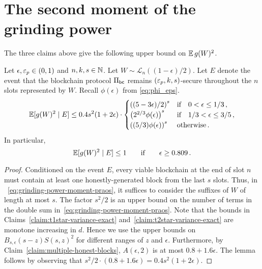 \section{The second moment of the grinding power}
The three claims above give the following upper bound on $\operatorname{\mathbb{E}} g(W)^2$.


\begin{lemma}\label{lemma:grinding-praos-second-moment}
  Let $\epsilon, \mathsf{\varepsilon}_p \in (0, 1)$ and $n, k, s \in \mathbb{N}$. 
  Let $W \sim \mathcal{L}_n((1 - \epsilon)/2)$. 
  Let $E$ denote the event that 
  the blockchain protocol $\Pi_\mathsf{bc}$ 
  remains $(\mathsf{\varepsilon}_p, k, s)$-secure throughout 
  the $n$ slots represented by $W$. 
  Recall $\phi(\epsilon)$ from \eqref{eq:phi_eps}.  
  \begin{equation}\label{eq:grinding-praos-second-moment}
    \operatorname{\mathbb{E}}[ g(W)^2 \mid E] 
    \leq 
      0.4 s^2 (1 + 2\epsilon)
      \cdot \begin{cases}
      \left( (5-3 \epsilon)/2 \right)^s & \text{if}\quad 0 < \epsilon \leq 1/3\,, \\
      \left( 2^{2/3} \phi(\epsilon) \right)^s & \text{if}\quad 1/3 < \epsilon \leq 3/5\,, \\
      \left( (5/3) \phi(\epsilon) \right)^s & \text{otherwise}\,. 
    \end{cases}    
  \end{equation}
  In particular, 
  $$
    \operatorname{\mathbb{E}} [g(W)^2 \mid E] \leq 1
    \qquad \text{if} \qquad \epsilon \geq 0.809\,.
  $$
\end{lemma}
\begin{proof}
  Conditioned on the event $E$, 
  every viable blockchain at the end of slot $n$ 
  must contain at least one honestly-generated block from the last $s$ slots. 
  Thus, 
  in ~\eqref{eq:grinding-power-moment-praos}, 
  it suffices to consider the suffixes of $W$ of length at most $s$. 
  The factor $s^2/2$ is an upper bound on 
  the number of terms in the double sum in~\eqref{eq:grinding-power-moment-praos}. 
  Note that the bounds in 
  Claims~\ref{claim:t1star-variance-exact} 
  and~\ref{claim:t2star-variance-exact} are monotone increasing in $d$. 
  Hence we use the upper bounds on $B_{s, \epsilon}(s-z) S(s,z)^2$ for 
  different ranges of $z$ and $\epsilon$. 
  Furthermore, by Claim~\ref{claim:multiple-honest-blocks}, 
  $A(\epsilon, 2)$ is at most $0.8 + 1.6 \epsilon$. 
  The lemma follows by observing that $s^2/2 \cdot (0.8 + 1.6 \epsilon) = 0.4 s^2 (1 + 2 \epsilon)$.
\end{proof}




